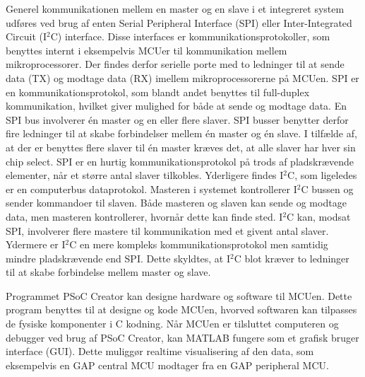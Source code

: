 Generel kommunikationen mellem en master og en slave i et integreret system udføres ved brug af enten Serial Peripheral Interface (SPI) eller Inter-Integrated Circuit (I$^{2}$C) interface. Disse interfaces er kommunikationsprotokoller, som benyttes internt i eksempelvis MCUer til kommunikation mellem mikroprocessorer. Der findes derfor serielle porte med to ledninger til at sende data (TX) og modtage data (RX) imellem mikroprocessorerne på MCUen. \citep{Semiconductor2016} \newline
SPI er en kommunikationsprotokol, som blandt andet benyttes til full-duplex kommunikation, hvilket giver mulighed for både at sende og modtage data. En SPI bus involverer én master og en eller flere slaver. SPI busser benytter derfor fire ledninger til at skabe forbindelser mellem én master og én slave. I tilfælde af, at der er benyttes flere slaver til én master kræves det, at alle slaver har hver sin chip select. SPI er en hurtig kommunikationsprotokol på trods af pladskrævende elementer, når et større antal slaver tilkobles. \citep{Semiconductor2016,Sparkfun2016} \newline
Yderligere findes I$^{2}$C, som ligeledes er en computerbus dataprotokol. Masteren i systemet kontrollerer I$^{2}$C bussen og sender kommandoer til slaven. Både masteren og slaven kan sende og modtage data, men masteren kontrollerer, hvornår dette kan finde sted. I$^{2}$C kan, modsat SPI, involverer flere mastere til kommunikation med et givent antal slaver. Ydermere er I$^{2}$C en mere kompleks kommunikationsprotokol men samtidig mindre pladskrævende end SPI. Dette skyldtes, at I$^{2}$C blot kræver to ledninger til at skabe forbindelse mellem master og slave. \citep{Semiconductor2016,Sparkfun2016} %

Programmet PSoC Creator kan designe hardware og software til MCUen. Dette program benyttes til at designe og kode MCUen, hvorved softwaren kan tilpasses de fysiske komponenter i C kodning. \citep{Semiconductor2016} Når MCUen er tilsluttet computeren og debugger ved brug af PSoC Creator, kan MATLAB fungere som et grafisk bruger interface (GUI). Dette muliggør realtime visualisering af den data, som eksempelvis en GAP central MCU modtager fra en GAP peripheral MCU.\citep{Semiconductor2016,Sparkfun2016}

